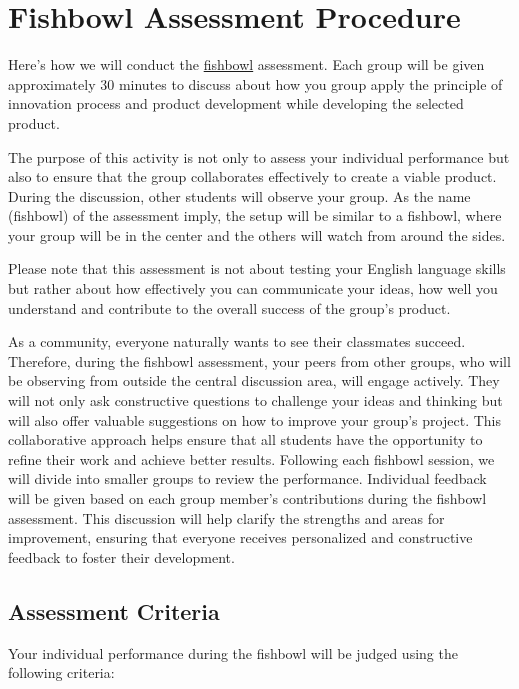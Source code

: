 \section{Fishbowl Assessment Procedure}

Here's how we will conduct the \href{https://www.learningforjustice.org/classroom-resources/teaching-strategies/community-inquiry/fishbowl}{fishbowl} assessment. Each group will be given approximately 30 minutes to discuss about how you group apply the principle of innovation process and product development while developing the selected product. 

The purpose of this activity is not only to assess your individual performance but also to ensure that the group collaborates effectively to create a viable product. During the discussion, other students will observe your group. As the name (fishbowl)  of the assessment imply, the setup will be similar to a fishbowl, where your group will be in the center and the others will watch from around the sides.

Please note that this assessment is not about testing your English language skills but rather about how effectively you can communicate your ideas, how well you understand and contribute to the overall success of the group's product.

As a community, everyone naturally wants to see their classmates succeed. Therefore, during the fishbowl assessment, your peers from other groups, who will be observing from outside the central discussion area, will engage actively. They will not only ask constructive questions to challenge your ideas and thinking but will also offer valuable suggestions on how to improve your group’s project. This collaborative approach helps ensure that all students have the opportunity to refine their work and achieve better results.
Following each fishbowl session, we will divide into smaller groups to review the performance. Individual feedback will be given based on each group member's contributions during the fishbowl assessment. This discussion will help clarify the strengths and areas for improvement, ensuring that everyone receives personalized and constructive feedback to foster their development.


\subsection{Assessment Criteria}

Your individual performance during the fishbowl will be judged using the following criteria:

